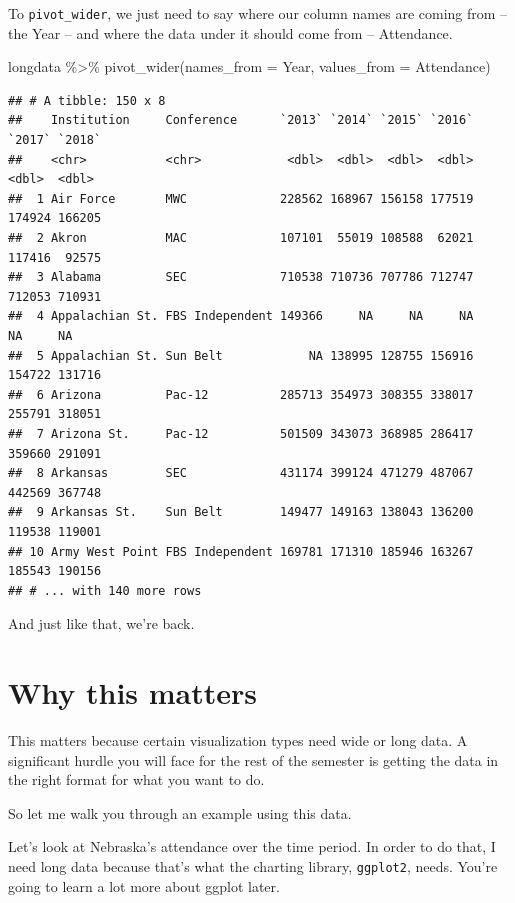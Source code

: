 \documentclass[
]{book}
\newenvironment{Shaded}{\begin{snugshade}}{\end{snugshade}}
\newcommand{\AttributeTok}[1]{\textcolor[rgb]{0.77,0.63,0.00}{#1}}
\newcommand{\FunctionTok}[1]{\textcolor[rgb]{0.00,0.00,0.00}{#1}}
\newcommand{\NormalTok}[1]{#1}
\newcommand{\SpecialCharTok}[1]{\textcolor[rgb]{0.00,0.00,0.00}{#1}}
\begin{document}
To \texttt{pivot\_wider}, we just need to say where our column names are coming from -- the Year -- and where the data under it should come from -- Attendance.

\begin{Shaded}
\begin{Highlighting}[]
\NormalTok{longdata }\SpecialCharTok{\%\textgreater{}\%} \FunctionTok{pivot\_wider}\NormalTok{(}\AttributeTok{names\_from =}\NormalTok{ Year, }\AttributeTok{values\_from =}\NormalTok{ Attendance)}
\end{Highlighting}
\end{Shaded}

\begin{verbatim}
## # A tibble: 150 x 8
##    Institution     Conference      `2013` `2014` `2015` `2016` `2017` `2018`
##    <chr>           <chr>            <dbl>  <dbl>  <dbl>  <dbl>  <dbl>  <dbl>
##  1 Air Force       MWC             228562 168967 156158 177519 174924 166205
##  2 Akron           MAC             107101  55019 108588  62021 117416  92575
##  3 Alabama         SEC             710538 710736 707786 712747 712053 710931
##  4 Appalachian St. FBS Independent 149366     NA     NA     NA     NA     NA
##  5 Appalachian St. Sun Belt            NA 138995 128755 156916 154722 131716
##  6 Arizona         Pac-12          285713 354973 308355 338017 255791 318051
##  7 Arizona St.     Pac-12          501509 343073 368985 286417 359660 291091
##  8 Arkansas        SEC             431174 399124 471279 487067 442569 367748
##  9 Arkansas St.    Sun Belt        149477 149163 138043 136200 119538 119001
## 10 Army West Point FBS Independent 169781 171310 185946 163267 185543 190156
## # ... with 140 more rows
\end{verbatim}

And just like that, we're back.

\hypertarget{why-this-matters}{%
\section{Why this matters}\label{why-this-matters}}

This matters because certain visualization types need wide or long data. A significant hurdle you will face for the rest of the semester is getting the data in the right format for what you want to do.

So let me walk you through an example using this data.

Let's look at Nebraska's attendance over the time period. In order to do that, I need long data because that's what the charting library, \texttt{ggplot2}, needs. You're going to learn a lot more about ggplot later.
\end{document}
